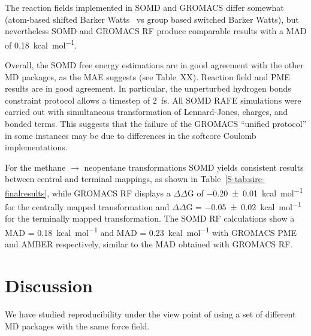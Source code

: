 \documentclass[journal=jctcce,manuscript=article]{achemso}
\begin{document}
The reaction fields implemented in SOMD and GROMACS differ somewhat (atom-based 
shifted Barker Watts~\cite{doi:10.1080/00268977300102101} vs group based 
switched Barker Watts), but nevertheless SOMD and GROMACS RF produce comparable results with a MAD of \SI{0.18}{kcal.mol^{-1}}.

Overall, the SOMD free energy estimations are in good agreement with the 
other MD packages, as the MAE suggests (see Table~XX). 
 Reaction field and PME 
results are in good agreement.  In particular, the unperturbed hydrogen bonds 
constraint protocol allows a timestep of \SI{2}{fs}. All SOMD RAFE simulations were carried out with simultaneous transformation of Lennard-Jones, charges, and bonded terms. This suggests that the failure of the GROMACS ``unified protocol'' in some 
instances may be due to differences in the softcore Coulomb implementations. 


For the methane $\rightarrow$ neopentane transformations SOMD yields consistent results between central and terminal mappings, as shown in 
Table~\ref{S-tab:sire-finalresults}, while GROMACS RF displays a $\Delta\Delta$G 
of \SI{-0.20 +-   0.01}{kcal.mol^{-1}} for the centrally mapped transformation 
and $\Delta\Delta$G = \SI{-0.05 +- 0.02}{kcal.mol^{-1}} for the terminally 
mapped transformation. The SOMD RF calculations show a MAD = 
\SI{0.18}{kcal.mol^{-1}} and MAD = \SI{0.23}{kcal.mol^{-1}} with GROMACS PME 
and AMBER respectively, similar to the MAD obtained with GROMACS RF.


\section{Discussion}
\label{sec:discuss}

We have studied reproducibility under the view point of using a set of 
different MD packages with the same force field. %
\end{document}
